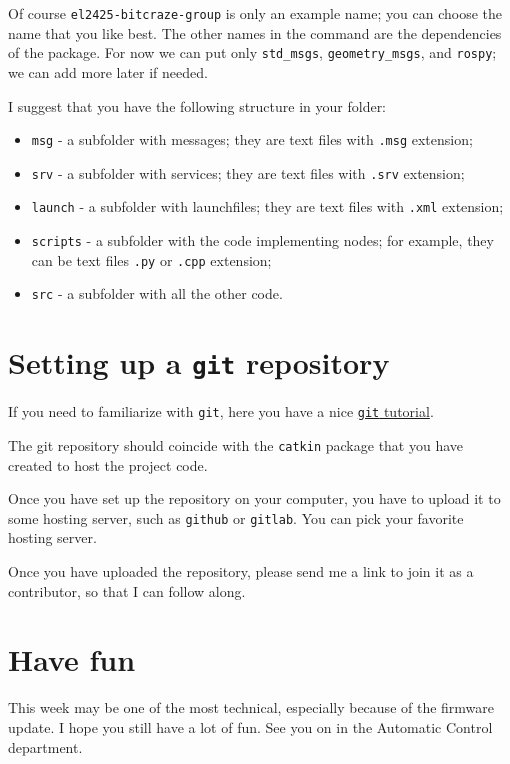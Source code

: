 Of course \texttt{el2425-bitcraze-group} is only an example name;
you can choose the name that you like best.
The other names in the command are the dependencies of the package.
For now we can put only \lstinline|std_msgs|, \lstinline|geometry_msgs|, and \lstinline|rospy|;
we can add more later if needed.

I suggest that you have the following structure in your folder:

\begin{itemize}
  \item \lstinline|msg| - a subfolder with \ROS{} messages; they are text files with \lstinline|.msg| extension;
  \item \lstinline|srv| - a subfolder with \ROS{} services; they are text files with \lstinline|.srv| extension;
  \item \lstinline|launch| - a subfolder with \ROS{} launchfiles; they are text files with \lstinline|.xml| extension;
  \item \lstinline|scripts| - a subfolder with the code implementing \ROS{} nodes; for example, they can be text files \lstinline|.py| or \lstinline|.cpp| extension;
  \item \lstinline|src| - a subfolder with all the other code.
\end{itemize}







\section*{Setting up a \texttt{git} repository}

If you need to familiarize with \texttt{git}, here you have a nice \href{https://try.github.io/levels/1/challenges/1}{\texttt{git} tutorial}.

The git repository should coincide with the \texttt{catkin} package that you have created to host the project code.

Once you have set up the repository on your computer, you have to upload it to some hosting server, such as \texttt{github} or \texttt{gitlab}.
You can pick your favorite hosting server.

Once you have uploaded the repository, please send me a link to join it as a contributor, so that I can follow along.




\section*{Have fun}

This week may be one of the most technical, especially because of the firmware update.
I hope you still have a lot of fun.
See you on  in the Automatic Control department.
